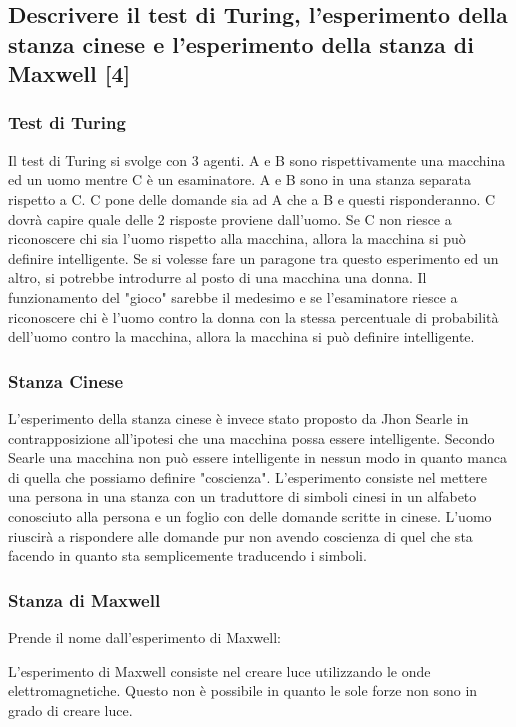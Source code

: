 \documentclass[\main/main.tex]{subfiles}
\begin{document}
\subsection{Descrivere il test di Turing, l'esperimento della stanza cinese e l'esperimento della stanza di Maxwell [4]}
\subsubsection{Test di Turing}
Il test di Turing si svolge con 3 agenti. A e B sono rispettivamente una macchina ed un uomo mentre C è un esaminatore. A e B sono in una stanza separata rispetto a C. C pone delle domande sia ad A che a B e questi risponderanno. C dovrà capire quale delle 2 risposte proviene dall'uomo. Se C non riesce a riconoscere chi sia l'uomo rispetto alla macchina, allora la macchina si può definire intelligente.
Se si volesse fare un paragone tra questo esperimento ed un altro, si potrebbe introdurre al posto di una macchina una donna. Il funzionamento del "gioco" sarebbe il medesimo e se l'esaminatore riesce a riconoscere chi è l'uomo contro la donna con la stessa percentuale di probabilità dell'uomo contro la macchina, allora la macchina si può definire intelligente.

\subsubsection{Stanza Cinese}
L'esperimento della stanza cinese è invece stato proposto da Jhon Searle in contrapposizione all'ipotesi che una macchina possa essere intelligente. Secondo Searle una macchina non può essere intelligente in nessun modo in quanto manca di quella che possiamo definire "coscienza". L'esperimento consiste nel mettere una persona in una stanza con un traduttore di simboli cinesi in un alfabeto conosciuto alla persona e un foglio con delle domande scritte in cinese. L'uomo riuscirà a rispondere alle domande pur non avendo coscienza di quel che sta facendo in quanto sta semplicemente traducendo i simboli.

\subsubsection*{Stanza di Maxwell}
Prende il nome dall'esperimento di Maxwell:

L'esperimento di Maxwell consiste nel creare luce utilizzando le onde elettromagnetiche. Questo non è possibile in quanto le sole forze non sono in grado di creare luce.
\end{document}

